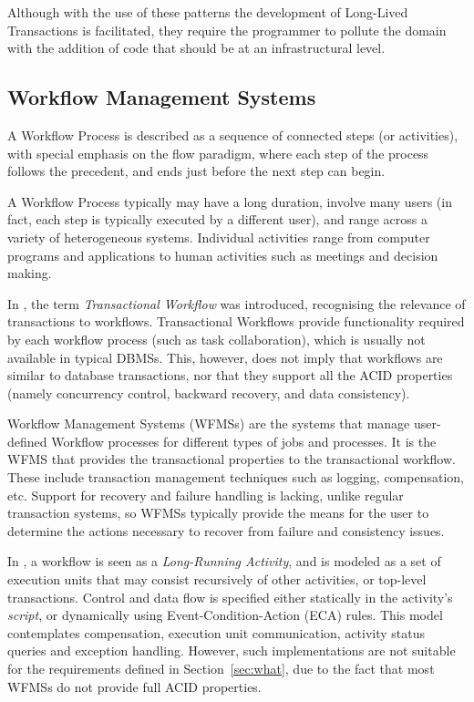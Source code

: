 \documentclass{llncs}
\begin{document}
Although with the use of these patterns the development of Long-Lived
Transactions is facilitated, they require the programmer to pollute
the domain with the addition of code that should be at an
infrastructural level.

\subsection{Workflow Management Systems}

A Workflow Process is described as a sequence of connected steps (or
activities), with special emphasis on the flow paradigm, where each
step of the process follows the precedent, and ends just before the
next step can begin.

A Workflow Process typically may have a long duration, involve many
users (in fact, each step is typically executed by a different user),
and range across a variety of heterogeneous systems. Individual
activities range from computer programs and applications to human
activities such as meetings and decision making.

In \cite{sheth1993transactional}, the term {\it Transactional
  Workflow} was introduced, recognising the relevance of transactions
to workflows. Transactional Workflows provide functionality required
by each workflow process (such as task collaboration), which is
usually not available in typical DBMSs. This, however, does not imply
that workflows are similar to database transactions, nor that they
support all the ACID properties (namely concurrency control, backward
recovery, and data consistency).

Workflow Management Systems (WFMSs) are the systems that manage
user-defined Workflow processes for different types of jobs and
processes. It is the WFMS that provides the transactional properties
to the transactional workflow. These include transaction management
techniques such as logging, compensation, etc. Support for recovery
and failure handling is lacking, unlike regular transaction systems,
so WFMSs typically provide the means for the user to determine the
actions necessary to recover from failure and consistency issues.

In \cite{dayal1990organizing}, a workflow is seen as a {\it
  Long-Running Activity}, and is modeled as a set of execution units
that may consist recursively of other activities, or top-level
transactions. Control and data flow is specified either statically in
the activity's {\it script}, or dynamically using
Event-Condition-Action (ECA) rules. This model contemplates
compensation, execution unit communication, activity status queries
and exception handling.  However, such implementations are not
suitable for the requirements defined in Section~\ref{sec:what}, due
to the fact that most WFMSs do not provide full ACID properties.
\end{document}
